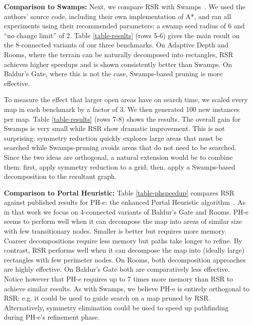 \par
\textbf{Comparison to Swamps:}
Next, we compare RSR with Swamps~\cite{pochter10}.  
We used the authors' source code, including their own implementation of A*, and 
ran all experiments using their recommended parameters: a swamp seed radius of 6 
and ``no change limit'' of 2. Table \ref{table-results} (rows 5-6) gives the main
result on the 8-connected variants of our three benchmarks.
On Adaptive Depth and Rooms, where the terrain can be naturally decomposed into
rectangles, RSR achieves higher speedups and is shown consistently better than Swamps. 
On Baldur's Gate, where this is not the case, Swamps-based pruning is more
effective. 
\par
To measure the effect that larger open areas have on search time, we scaled
every map in each benchmark by a factor of 3. We then generated 100
new instances per map. Table \ref{table-results} (rows 7-8) shows the results.  
The overall gain for Swamps is very small while RSR show dramatic improvement.
This is not surprising: symmetry reduction quickly explores large
areas that must be searched while Swamps-pruning avoids areas
that do not need to be searched.
Since the two ideas are orthogonal, a natural extension would be to combine them: 
first, apply symmetry reduction to a grid; then, apply a Swamps-based 
decomposition to the resultant graph.


\textbf{Comparison to Portal Heuristic:}
Table \ref{table-phspeedup} compares RSR against published results for PH-e: the enhanced 
Portal Heuristic algorithm~\cite{goldenberg10}.  As in that work we focus
on 4-connected variants of Baldur's Gate and Rooms.
PH-e seems to perform well when it can decompose the map into areas of similar 
size with few transitionary nodes. Smaller is better but requires
more memory. Coarser decompositions require less memory but paths take longer
to refine. 
By contrast, RSR performs well when it can decompose the map into (ideally large) 
rectangles with few perimeter nodes.
On Rooms, both decomposition approaches are highly effective. 
On Baldur's Gate both are comparatively less effective.
Notice however that PH-e requires up to 7 times more memory than RSR to achieve
similar results.
As with Swamps, we believe PH-e is entirely orthogonal to RSR: e.g.
it could be used to guide search on a map pruned by RSR. Alternatively, 
symmetry elimination could be used to speed up pathfinding during PH-e's refinement phase.



